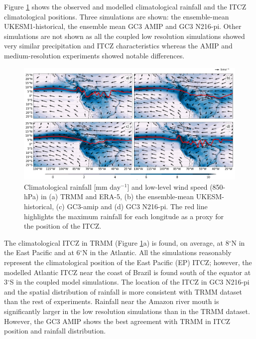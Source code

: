 Figure \ref{fig:3} shows the observed and modelled climatological rainfall and the ITCZ climatological positions. Three simulations are shown: the ensemble-mean UKESM1-historical, the ensemble mean GC3 AMIP and GC3 N216-pi.
Other simulations are not shown as all the coupled low resolution simulations showed very similar precipitation and ITCZ characteristics whereas the AMIP and medium-resolution experiments showed notable differences.

\begin{figure}[t!]
\centering
 \includegraphics[width=\linewidth]{figures/itcz_clim_d.png}
\caption{ Climatological rainfall [mm day$^{-1}$] and low-level wind speed (850-hPa) in (a) TRMM and ERA-5, (b) the ensemble-mean UKESM-historical, (c) GC3-amip and (d) GC3 N216-pi. The red line highlights the maximum rainfall for each longitude as a proxy for the position of the ITCZ.  }
\label{fig:3}
\end{figure}

The climatological ITCZ in TRMM (Figure \ref{fig:3}a) is found, on average, at 8$^\circ$N in the East Pacific and at 6$^\circ$N in the Atlantic.
All the simulations reasonably represent the climatological position of the East Pacific (EP) ITCZ; however, the modelled Atlantic ITCZ near the coast of Brazil is found south of the equator at 3$^\circ$S in the coupled model simulations.
The location of the ITCZ in GC3 N216-pi and the spatial distribution of rainfall is more consistent with TRMM dataset than the rest of experiments.
Rainfall near the Amazon river mouth is significantly larger in the low resolution simulations than in the TRMM dataset. 
 However, the GC3 AMIP shows the best agreement with TRMM in ITCZ position and rainfall distribution. 

